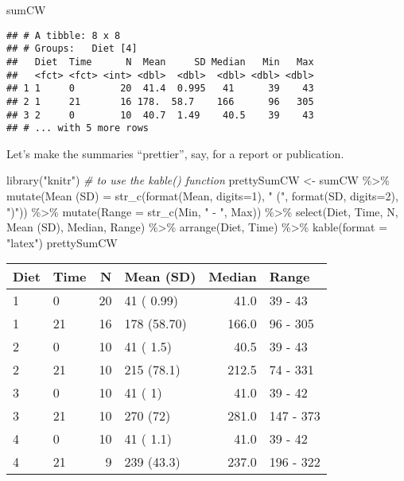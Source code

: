 \documentclass[
]{book}
\newenvironment{Shaded}{\begin{snugshade}}{\end{snugshade}}
\newcommand{\AttributeTok}[1]{\textcolor[rgb]{0.77,0.63,0.00}{#1}}
\newcommand{\CommentTok}[1]{\textcolor[rgb]{0.56,0.35,0.01}{\textit{#1}}}
\newcommand{\DecValTok}[1]{\textcolor[rgb]{0.00,0.00,0.81}{#1}}
\newcommand{\FunctionTok}[1]{\textcolor[rgb]{0.00,0.00,0.00}{#1}}
\newcommand{\NormalTok}[1]{#1}
\newcommand{\OtherTok}[1]{\textcolor[rgb]{0.56,0.35,0.01}{#1}}
\newcommand{\SpecialCharTok}[1]{\textcolor[rgb]{0.00,0.00,0.00}{#1}}
\newcommand{\StringTok}[1]{\textcolor[rgb]{0.31,0.60,0.02}{#1}}
\begin{document}
\begin{Shaded}
\begin{Highlighting}[]
\NormalTok{sumCW}
\end{Highlighting}
\end{Shaded}

\begin{verbatim}
## # A tibble: 8 x 8
## # Groups:   Diet [4]
##   Diet  Time      N  Mean     SD Median   Min   Max
##   <fct> <fct> <int> <dbl>  <dbl>  <dbl> <dbl> <dbl>
## 1 1     0        20  41.4  0.995   41      39    43
## 2 1     21       16 178.  58.7    166      96   305
## 3 2     0        10  40.7  1.49    40.5    39    43
## # ... with 5 more rows
\end{verbatim}

Let's make the summaries ``prettier'', say, for a report or publication.

\begin{Shaded}
\begin{Highlighting}[]
\FunctionTok{library}\NormalTok{(}\StringTok{"knitr"}\NormalTok{) }\CommentTok{\# to use the kable() function}
\NormalTok{prettySumCW }\OtherTok{\textless{}{-}}\NormalTok{ sumCW }\SpecialCharTok{\%\textgreater{}\%} 
 \FunctionTok{mutate}\NormalTok{(}\StringTok{\textasciigrave{}}\AttributeTok{Mean (SD)}\StringTok{\textasciigrave{}} \OtherTok{=} \FunctionTok{str\_c}\NormalTok{(}\FunctionTok{format}\NormalTok{(Mean, }\AttributeTok{digits=}\DecValTok{1}\NormalTok{),}
           \StringTok{" ("}\NormalTok{, }\FunctionTok{format}\NormalTok{(SD, }\AttributeTok{digits=}\DecValTok{2}\NormalTok{), }\StringTok{")"}\NormalTok{)) }\SpecialCharTok{\%\textgreater{}\%} 
 \FunctionTok{mutate}\NormalTok{(}\AttributeTok{Range =} \FunctionTok{str\_c}\NormalTok{(Min, }\StringTok{" {-} "}\NormalTok{, Max)) }\SpecialCharTok{\%\textgreater{}\%} 
 \FunctionTok{select}\NormalTok{(Diet, Time, N, }\StringTok{\textasciigrave{}}\AttributeTok{Mean (SD)}\StringTok{\textasciigrave{}}\NormalTok{, Median, Range) }\SpecialCharTok{\%\textgreater{}\%}
 \FunctionTok{arrange}\NormalTok{(Diet, Time) }\SpecialCharTok{\%\textgreater{}\%} 
 \FunctionTok{kable}\NormalTok{(}\AttributeTok{format =} \StringTok{"latex"}\NormalTok{)}
\NormalTok{prettySumCW}
\end{Highlighting}
\end{Shaded}

\begin{tabular}{l|l|r|l|r|l}
\hline
Diet & Time & N & Mean (SD) & Median & Range\\
\hline
1 & 0 & 20 & 41 ( 0.99) & 41.0 & 39 - 43\\
\hline
1 & 21 & 16 & 178 (58.70) & 166.0 & 96 - 305\\
\hline
2 & 0 & 10 & 41 ( 1.5) & 40.5 & 39 - 43\\
\hline
2 & 21 & 10 & 215 (78.1) & 212.5 & 74 - 331\\
\hline
3 & 0 & 10 & 41 ( 1) & 41.0 & 39 - 42\\
\hline
3 & 21 & 10 & 270 (72) & 281.0 & 147 - 373\\
\hline
4 & 0 & 10 & 41 ( 1.1) & 41.0 & 39 - 42\\
\hline
4 & 21 & 9 & 239 (43.3) & 237.0 & 196 - 322\\
\hline
\end{tabular}
\end{document}
